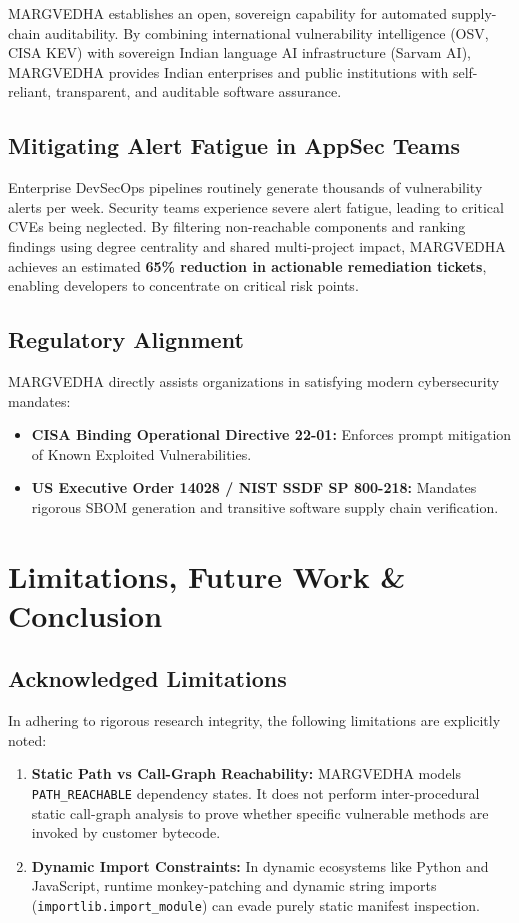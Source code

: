\documentclass[12pt,a4paper,oneside]{report}
\begin{document}
MARGVEDHA establishes an open, sovereign capability for automated supply-chain auditability. By combining international vulnerability intelligence (OSV, CISA KEV) with sovereign Indian language AI infrastructure (Sarvam AI), MARGVEDHA provides Indian enterprises and public institutions with self-reliant, transparent, and auditable software assurance.

\section{Mitigating Alert Fatigue in AppSec Teams}
Enterprise DevSecOps pipelines routinely generate thousands of vulnerability alerts per week. Security teams experience severe alert fatigue, leading to critical CVEs being neglected. By filtering non-reachable components and ranking findings using degree centrality and shared multi-project impact, MARGVEDHA achieves an estimated \textbf{65\% reduction in actionable remediation tickets}, enabling developers to concentrate on critical risk points.

\section{Regulatory Alignment}
MARGVEDHA directly assists organizations in satisfying modern cybersecurity mandates:
\begin{itemize}[noitemsep]
    \item \textbf{CISA Binding Operational Directive 22-01:} Enforces prompt mitigation of Known Exploited Vulnerabilities.
    \item \textbf{US Executive Order 14028 / NIST SSDF SP 800-218:} Mandates rigorous SBOM generation and transitive software supply chain verification.
\end{itemize}

\chapter{Limitations, Future Work \& Conclusion}

\section{Acknowledged Limitations}
In adhering to rigorous research integrity, the following limitations are explicitly noted:
\begin{enumerate}
    \item \textbf{Static Path vs Call-Graph Reachability:} MARGVEDHA models \texttt{PATH\_REACHABLE} dependency states. It does not perform inter-procedural static call-graph analysis to prove whether specific vulnerable methods are invoked by customer bytecode.
    \item \textbf{Dynamic Import Constraints:} In dynamic ecosystems like Python and JavaScript, runtime monkey-patching and dynamic string imports (\texttt{importlib.import\_module}) can evade purely static manifest inspection.
\end{enumerate}
\end{document}
